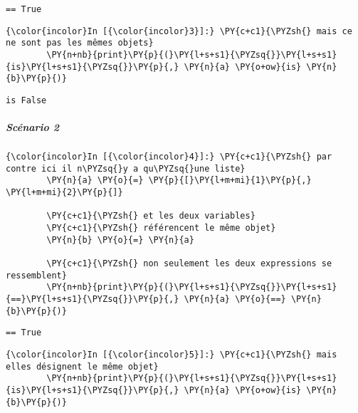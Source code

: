     \begin{Verbatim}[commandchars=\\\{\}]
== True

    \end{Verbatim}

    \begin{Verbatim}[commandchars=\\\{\}]
{\color{incolor}In [{\color{incolor}3}]:} \PY{c+c1}{\PYZsh{} mais ce ne sont pas les mêmes objets}
        \PY{n+nb}{print}\PY{p}{(}\PY{l+s+s1}{\PYZsq{}}\PY{l+s+s1}{is}\PY{l+s+s1}{\PYZsq{}}\PY{p}{,} \PY{n}{a} \PY{o+ow}{is} \PY{n}{b}\PY{p}{)}
\end{Verbatim}


    \begin{Verbatim}[commandchars=\\\{\}]
is False

    \end{Verbatim}

    \hypertarget{scuxe9nario-2}{%
\subparagraph{Scénario 2}\label{scuxe9nario-2}}

    \begin{Verbatim}[commandchars=\\\{\}]
{\color{incolor}In [{\color{incolor}4}]:} \PY{c+c1}{\PYZsh{} par contre ici il n\PYZsq{}y a qu\PYZsq{}une liste}
        \PY{n}{a} \PY{o}{=} \PY{p}{[}\PY{l+m+mi}{1}\PY{p}{,} \PY{l+m+mi}{2}\PY{p}{]}
        
        \PY{c+c1}{\PYZsh{} et les deux variables}
        \PY{c+c1}{\PYZsh{} référencent le même objet}
        \PY{n}{b} \PY{o}{=} \PY{n}{a}
        
        \PY{c+c1}{\PYZsh{} non seulement les deux expressions se ressemblent}
        \PY{n+nb}{print}\PY{p}{(}\PY{l+s+s1}{\PYZsq{}}\PY{l+s+s1}{==}\PY{l+s+s1}{\PYZsq{}}\PY{p}{,} \PY{n}{a} \PY{o}{==} \PY{n}{b}\PY{p}{)}
\end{Verbatim}


    \begin{Verbatim}[commandchars=\\\{\}]
== True

    \end{Verbatim}

    \begin{Verbatim}[commandchars=\\\{\}]
{\color{incolor}In [{\color{incolor}5}]:} \PY{c+c1}{\PYZsh{} mais elles désignent le même objet}
        \PY{n+nb}{print}\PY{p}{(}\PY{l+s+s1}{\PYZsq{}}\PY{l+s+s1}{is}\PY{l+s+s1}{\PYZsq{}}\PY{p}{,} \PY{n}{a} \PY{o+ow}{is} \PY{n}{b}\PY{p}{)}
\end{Verbatim}


